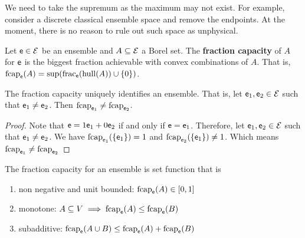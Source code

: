 \begin{remark}
	We need to take the supremum as the maximum may not exist. For example, consider a discrete classical ensemble space and remove the endpoints. At the moment, there is no reason to rule out such space as unphysical.
\end{remark}

\begin{defn}
	Let $\mathsf{e} \in \mathcal{E}$ be an ensemble and $A \subseteq \mathcal{E}$ a Borel set. The \textbf{fraction capacity} of $A$ for $\mathsf{e}$ is the biggest fraction achievable with convex combinations of $A$. That is, $\mathrm{fcap}_{\mathsf{e}}(A) = \sup(\mathrm{frac}_{\mathsf{e}}(\mathrm{hull}(A))\cup\{0\})$.
\end{defn}

\begin{coro}
	The fraction capacity uniquely identifies an ensemble. That is, let $\mathsf{e}_1, \mathsf{e}_2 \in \mathcal{E}$ such that $\mathsf{e}_1 \neq \mathsf{e}_2$. Then $\mathrm{fcap}_{\mathsf{e}_1} \neq \mathrm{fcap}_{\mathsf{e}_2}$.
\end{coro}

\begin{proof}
	Note that $\mathsf{e} = 1 \mathsf{e}_1 + 0 \mathsf{e}_2$ if and only if $\mathsf{e} = \mathsf{e}_1$. Therefore, let $\mathsf{e}_1, \mathsf{e}_2 \in \mathcal{E}$ such that $\mathsf{e}_1 \neq \mathsf{e}_2$. We have $\mathrm{fcap}_{\mathsf{e}_1}(\{\mathsf{e}_1\}) = 1$ and $\mathrm{fcap}_{\mathsf{e}_2}(\{\mathsf{e}_1\}) \neq 1$. Which means $\mathrm{fcap}_{\mathsf{e}_1} \neq \mathrm{fcap}_{\mathsf{e}_2}$
\end{proof}


\begin{prop}
	The fraction capacity for an ensemble is set function that is
	\begin{enumerate}
		\item non negative and unit bounded: $\mathrm{fcap}_{\mathsf{e}}(A) \in [0,1]$
		\item monotone: $A \subseteq V \implies \mathrm{fcap}_{\mathsf{e}}(A) \leq \mathrm{fcap}_{\mathsf{e}}(B)$
		\item subadditive: $\mathrm{fcap}_{\mathsf{e}}(A \cup B) \leq \mathrm{fcap}_{\mathsf{e}}(A) + \mathrm{fcap}_{\mathsf{e}}(B)$
	\end{enumerate}
\end{prop}

